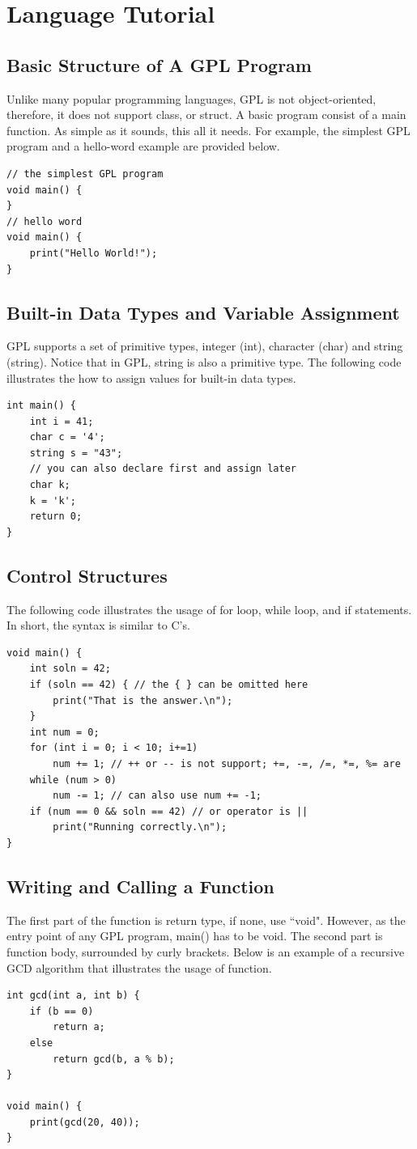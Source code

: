 \documentclass[a4paper,12pt]{article}
\begin{document}
\section{Language Tutorial}
\subsection{Basic Structure of A GPL Program}
Unlike many popular programming languages, GPL is not object-oriented, therefore, it does not support class, or struct. A basic program consist of a main function. As simple as it sounds, this all it needs. For example, the simplest GPL program and a hello-word example are provided below.
\begin{lstlisting}
// the simplest GPL program
void main() {
}
// hello word
void main() {
	print("Hello World!");
}
\end{lstlisting}

\subsection{Built-in Data Types and Variable Assignment}
GPL supports a set of primitive types, integer (int), character (char) and string (string). Notice that in GPL, string is also a primitive type. The following code illustrates the how to assign values for built-in data types.
\begin{lstlisting}
int main() {
	int i = 41;
	char c = '4';
	string s = "43";
	// you can also declare first and assign later
	char k;
	k = 'k';
	return 0;
}
\end{lstlisting}

\subsection{Control Structures}
The following code illustrates the usage of for loop, while loop, and if statements. In short, the syntax is similar to C's.
\begin{lstlisting}
void main() {
	int soln = 42;
	if (soln == 42) { // the { } can be omitted here
		print("That is the answer.\n");
	}
	int num = 0;
	for (int i = 0; i < 10; i+=1)
		num += 1; // ++ or -- is not support; +=, -=, /=, *=, %= are
	while (num > 0)
		num -= 1; // can also use num += -1;
	if (num == 0 && soln == 42) // or operator is ||
		print("Running correctly.\n");
}
\end{lstlisting}

\subsection{Writing and Calling a Function}
The first part of the function is return type, if none, use ``void". However, as the entry point of any GPL program, main() has to be void. The second part is function body, surrounded by curly brackets. Below is an example of a recursive GCD algorithm that illustrates the usage of function.
\begin{lstlisting}
int gcd(int a, int b) {
	if (b == 0)
		return a;
	else
		return gcd(b, a % b);
}

void main() {
	print(gcd(20, 40));
}
\end{lstlisting}
\end{document}
